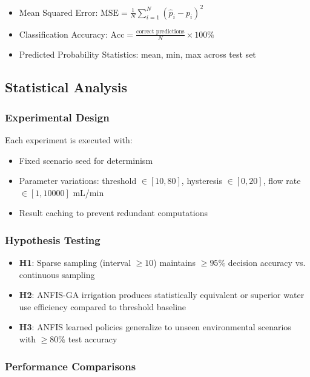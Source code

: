 \begin{itemize}
    \item Mean Squared Error: $\text{MSE} = \frac{1}{N} \sum_{i=1}^{N} (\hat{p}_i - p_i)^2$
    \item Classification Accuracy: $\text{Acc} = \frac{\text{correct predictions}}{N} \times 100\%$
    \item Predicted Probability Statistics: mean, min, max across test set
\end{itemize}

\subsection{Statistical Analysis}

\subsubsection{Experimental Design}

Each experiment is executed with:
\begin{itemize}
    \item Fixed scenario seed for determinism
    \item Parameter variations: threshold $\in [10, 80]$, hysteresis $\in [0, 20]$, flow rate $\in [1, 10000]$ mL/min
    \item Result caching to prevent redundant computations
\end{itemize}

\subsubsection{Hypothesis Testing}

\begin{itemize}
    \item \textbf{H1}: Sparse sampling (interval $\geq 10$) maintains $\geq 95\%$ decision accuracy vs. continuous sampling
    \item \textbf{H2}: ANFIS-GA irrigation produces statistically equivalent or superior water use efficiency compared to threshold baseline
    \item \textbf{H3}: ANFIS learned policies generalize to unseen environmental scenarios with $\geq 80\%$ test accuracy
\end{itemize}

\subsubsection{Performance Comparisons}

